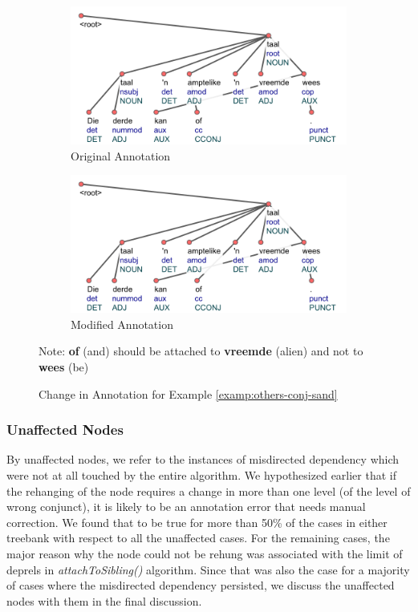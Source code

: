 \begin{figure}[H]
    \begin{subfigure}{\textwidth}
    \centering
    \includegraphics[scale=0.90]{img/others-conj-sand-1.png}
    \caption{Original Annotation}
    \label{fig:others-conj-sand-1}
    \end{subfigure}
    \begin{subfigure}{\textwidth}
    \centering
    \includegraphics[scale=0.90]{img/others-conj-sand-2.png}
    \caption{Modified Annotation}
    \label{fig:others-conj-sand-2}
    \end{subfigure}
    \caption{Change in Annotation for Example \ref{examp:others-conj-sand}}
    Note: \textbf{of} (and) should be attached to \textbf{vreemde} (alien) and not to \textbf{wees} (be)\\
    \label{fig:others-conj-sand}
\end{figure}

\subsubsection{Unaffected Nodes}

By unaffected nodes, we refer to the instances of misdirected dependency which were not at all touched by the entire algorithm. We hypothesized earlier that if the rehanging of the node requires a change in more than one level (of the level of wrong conjunct), it is likely to be an annotation error that needs manual correction. We found that to be true for more than 50\% of the cases in either treebank with respect to all the unaffected cases. For the remaining cases, the major reason why the node could not be rehung was associated with the limit of deprels in \textit{attachToSibling()} algorithm. Since that was also the case for a majority of cases where the misdirected dependency persisted, we discuss the unaffected nodes with them in the final discussion.


